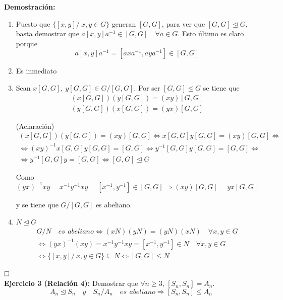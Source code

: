 \documentclass{article}
\begin{document}
\textbf{Demostración:}
\begin{enumerate}[\bfseries (i)]
\item Puesto que $\{[x,y]/\:x,y\in G\}$ generan $[G,G]$, para ver que $[G,G]\unlhd G$, basta demostrar que $a[x,y]a^{-1}\in [G,G]\quad \forall a\in G$. Esto último es claro porque
\begin{equation*}
a[x,y]a^{-1}=[axa^{-1},aya^{-1}]\in[G,G]
\end{equation*}

\item Es inmediato

\item Sean $x[G,G],\: y[G,G]\in G/[G,G]$. Por ser $\left[G,G\right]\unlhd G$ se tiene que
\begin{gather*}
(x[G,G])(y[G,G])=(xy)[G,G] \\
(y[G,G])(x[G,G])=(yx)[G,G]
\end{gather*}

(Aclaración)
\begin{gather*}
(x[G,G])(y[G,G])=(xy)[G,G]\Leftrightarrow x[G,G]y[G,G]=(xy)[G,G]\Leftrightarrow \\
\Leftrightarrow (xy)^{-1}x[G,G]y[G,G]=[G,G]\Leftrightarrow y^{-1}[G,G]y[G,G]=[G,G]\Leftrightarrow \\
\Leftrightarrow y^{-1}[G,G]y= [G,G]\Leftrightarrow [G,G]\unlhd G
\end{gather*}

Como
\begin{equation*}
(yx)^{-1}xy=x^{-1}y^{-1}xy=[x^{-1},y^{-1}]\in [G,G]\Rightarrow (xy)[G,G]=yx[G,G]
\end{equation*}

y se tiene que $G/[G,G]$ es abeliano.

\item $N\unlhd G$
\begin{gather*}
G/N\quad es\:\,abeliano\Leftrightarrow (xN)(yN)=(yN)(xN)\quad \forall x,y\in G\\
\Leftrightarrow (yx)^{-1}(xy)=x^{-1}y^{-1}xy=[x^{-1},y^{-1}]\in N\quad \forall x,y\in G\\
\Leftrightarrow \{[x,y]/\:x,y\in G\}\subseteq N\Leftrightarrow [G,G]\leq N
\end{gather*}
\end{enumerate}

$\hfill\square$ \\

\textbf{Ejercicio 3 (Relación 4):} Demostrar que $\forall n\geq 3$, $[S_n, S_n]=A_n$.
\begin{equation*}
A_n\unlhd S_n\quad y\quad S_n/A_n\quad es\:\,abeliano\Rightarrow [S_n,S_n]\leq A_n
\end{equation*}
\end{document}
